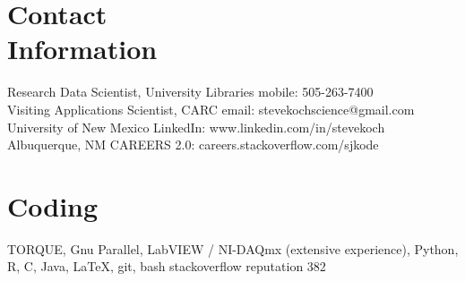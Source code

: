 \documentclass[margin,line]{resume}
\begin{document}
\begin{resume}

    \section{\mysidestyle Contact\\Information}

    Research Data Scientist, University Libraries                \hfill mobile: 505-263-7400          \vspace{0mm}\\\vspace{0mm}%
    Visiting Applications Scientist, CARC                                \hfill email: stevekochscience@gmail.com          \vspace{0mm}\\\vspace{0mm}%
    University of New Mexico                                         \hfill LinkedIn: www.linkedin.com/in/stevekoch  \vspace{0mm}\\\vspace{0mm}%
    Albuquerque, NM                                         \hfill CAREERS 2.0: careers.stackoverflow.com/sjkode  \vspace{0mm}\\\vspace{-4.5mm}%


%
%
    \section{\mysidestyle Coding} 

    TORQUE, Gnu Parallel, LabVIEW / NI-DAQmx (extensive experience), Python, R, C, Java, LaTeX, git, bash \newline stackoverflow reputation 382


\end{resume}
\end{document}

